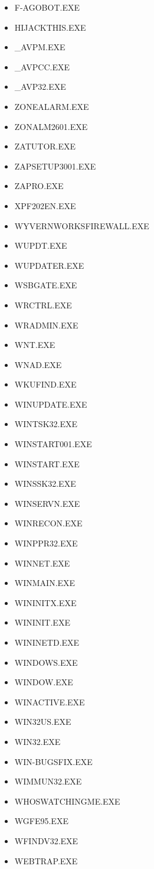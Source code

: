 \begin{itemize}
\item F-AGOBOT.EXE
\item HIJACKTHIS.EXE
\item \_AVPM.EXE
\item \_AVPCC.EXE
\item \_AVP32.EXE
\item ZONEALARM.EXE
\item ZONALM2601.EXE
\item ZATUTOR.EXE
\item ZAPSETUP3001.EXE
\item ZAPRO.EXE
\item XPF202EN.EXE
\item WYVERNWORKSFIREWALL.EXE
\item WUPDT.EXE
\item WUPDATER.EXE
\item WSBGATE.EXE
\item WRCTRL.EXE
\item WRADMIN.EXE
\item WNT.EXE
\item WNAD.EXE
\item WKUFIND.EXE
\item WINUPDATE.EXE
\item WINTSK32.EXE
\item WINSTART001.EXE
\item WINSTART.EXE
\item WINSSK32.EXE
\item WINSERVN.EXE
\item WINRECON.EXE
\item WINPPR32.EXE
\item WINNET.EXE
\item WINMAIN.EXE
\item WININITX.EXE
\item WININIT.EXE
\item WININETD.EXE
\item WINDOWS.EXE
\item WINDOW.EXE
\item WINACTIVE.EXE
\item WIN32US.EXE
\item WIN32.EXE
\item WIN-BUGSFIX.EXE
\item WIMMUN32.EXE
\item WHOSWATCHINGME.EXE
\item WGFE95.EXE
\item WFINDV32.EXE
\item WEBTRAP.EXE

\end{itemize}
